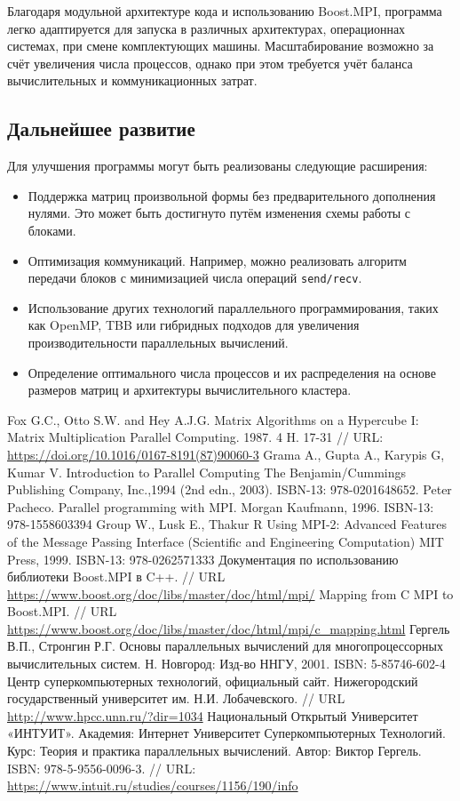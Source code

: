 \documentclass{report}
\begin{document}
Благодаря модульной архитектуре кода и использованию Boost.MPI, программа легко адаптируется для запуска в различных архитектурах, операционнах системах, при смене комплектующих машины. Масштабирование возможно за счёт увеличения числа процессов, однако при этом требуется учёт баланса вычислительных и коммуникационных затрат.

\subsection*{Дальнейшее развитие}
Для улучшения программы могут быть реализованы следующие расширения:
\begin{itemize}
    \item Поддержка матриц произвольной формы без предварительного дополнения нулями. Это может быть достигнуто путём изменения схемы работы с блоками.
    \item Оптимизация коммуникаций. Например, можно реализовать алгоритм передачи блоков с минимизацией числа операций \texttt{send/recv}.
    \item Использование других технологий параллельного программирования, таких как OpenMP, TBB или гибридных подходов для увеличения производительности параллельных вычислений.
    \item Определение оптимального числа процессов и их распределения на основе размеров матриц и архитектуры вычислительного кластера.
\end{itemize}
\clearpage

\begin{thebibliography}{1}
 Fox G.C., Otto S.W. and Hey A.J.G. Matrix Algorithms on a Hypercube I: Matrix Multiplication Parallel Computing. 1987. 4 H. 17-31 // URL: \url{https://doi.org/10.1016/0167-8191(87)90060-3}
Grama A., Gupta A., Karypis G, Kumar V. Introduction to Parallel Computing The Benjamin/Cummings Publishing Company, Inc.,1994 (2nd edn., 2003). ISBN-13: 978-0201648652. 
 Peter Pacheco. Parallel programming with MPI. Morgan Kaufmann, 1996. ISBN-13: 978-1558603394
 Group W., Lusk E., Thakur R Using MPI-2: Advanced Features of the Message Passing Interface (Scientific and Engineering Computation) MIT Press, 1999. ISBN-13: 978-0262571333
 Документация по использованию библиотеки Boost.MPI в C++. // URL \url{https://www.boost.org/doc/libs/master/doc/html/mpi/}
 Mapping from C MPI to Boost.MPI. // URL \url{https://www.boost.org/doc/libs/master/doc/html/mpi/c_mapping.html}
 Гергель В.П., Стронгин Р.Г. Основы параллельных вычислений для многопроцессорных вычислительных систем. Н. Новгород: Изд-во ННГУ, 2001. ISBN: 5-85746-602-4
 Центр суперкомпьютерных технологий, официальный сайт. Нижегородский
государственный университет им. Н.И. Лобачевского.  // URL \url {http://www.hpcc.unn.ru/?dir=1034}
 Национальный Открытый Университет «ИНТУИТ». Академия: Интернет Университет Суперкомпьютерных Технологий. Курс: Теория и практика параллельных вычислений. Автор: Виктор Гергель. ISBN: 978-5-9556-0096-3. // URL: \url {https://www.intuit.ru/studies/courses/1156/190/info}
\end{thebibliography}
\newpage
\end{document}
